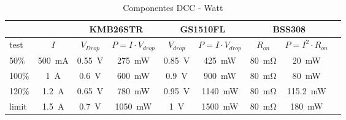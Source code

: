 \begin{table}[H]
    \centering
    \renewcommand\theadfont{\bfseries}
    \setlength{\tabcolsep}{10pt}
    \renewcommand{\arraystretch}{1.5}
    \begin{tabular}{|l|c|c|c|c|c|c|c|c|}
        \hline
              &                         & \multicolumn{2}{|c|}{KMB26STR} & \multicolumn{2}{|c|}{GS1510FL} & \multicolumn{2}{|c|}{BSS308}                          \\ \hline
        test  & $I$                     & $V_{Drop}$                     & $P=I\cdot V_{drop}$            & $V_{drop}$                   & $P=I\cdot V_{drop}$
              & $R_{on}$                & $P=I^2\cdot R_{on}$                                                                                                     \\ \hline
        50\%  & \SI{500}{\milli\ampere} & \SI{0.55}{\volt}               & \SI{275}{\milli\watt}          & \SI{0.85}{\volt}             & \SI{425}{\milli\watt}
              & \SI{80}{\milli\ohm}     & \SI{20}{\milli\watt}                                                                                                    \\ \hline
        100\% & \SI{1}{\ampere}         & \SI{0.6}{\volt}                & \SI{600}{\milli\watt}          & \SI{0.9}{\volt}              & \SI{900}{\milli\watt}
              & \SI{80}{\milli\ohm}     & \SI{80}{\milli\watt}                                                                                                    \\ \hline
        120\% & \SI{1.2}{\ampere}       & \SI{0.65}{\volt}               & \SI{780}{\milli\watt}          & \SI{0.95}{\volt}             & \SI{1140}{\milli\watt}
              & \SI{80}{\milli\ohm}     & \SI{115.2}{\milli\watt}                                                                                                 \\ \hline
        limit & \SI{1.5}{\ampere}       & \SI{0.7}{\volt}                & \SI{1050}{\milli\watt}         & \SI{1}{\volt}                & \SI{1500}{\milli\watt}
              & \SI{80}{\milli\ohm}     & \SI{180}{\milli\watt}                                                                                                   \\ \hline


        \hline
    \end{tabular}

    \caption{Componentes DCC - Watt}
    \label{tab:DccWatt}
\end{table}


